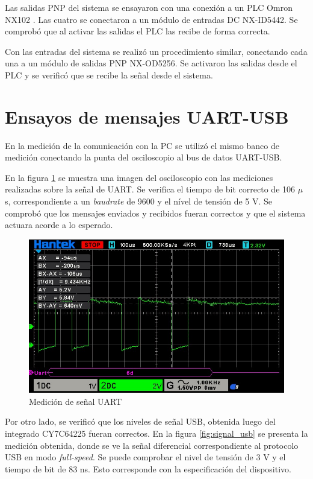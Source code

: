 Las salidas PNP del sistema se ensayaron con una conexión a un PLC Omron NX102 \citep{web_nx102}. Las cuatro se conectaron a un módulo de entradas DC NX-ID5442. Se comprobó que al activar las salidas el PLC las recibe de forma correcta.

Con las entradas del sistema se realizó un procedimiento similar, conectando cada una a un módulo de salidas PNP NX-OD5256. Se activaron las salidas desde el PLC y se verificó que se recibe la señal desde el sistema.

\section{Ensayos de mensajes UART-USB}

En la medición de la comunicación con la PC se utilizó el mismo banco de medición conectando la punta del osciloscopio al bus de datos UART-USB.

En la figura \ref{fig:signal_uart} se muestra una imagen del osciloscopio con las mediciones realizadas sobre la señal de UART. Se verifica el tiempo de bit correcto de 106 $\mu$s, correspondiente a un \textit{baudrate} de 9600 y el nível de tensión de 5 V. Se comprobó que los mensajes enviados y recibidos fueran correctos y que el sistema actuara acorde a lo esperado.

\begin{figure}[h!]
	\centering
	\includegraphics[scale=0.6]{./Figures/bit_time_uart.jpeg}
	\caption{Medición de señal UART}
	\label{fig:signal_uart}
\end{figure}

\newpage

Por otro lado, se verificó que los niveles de señal USB, obtenida luego del integrado CY7C64225 fueran correctos. En la figura \ref{fig:signal_usb} se presenta la medición obtenida, donde se ve la señal diferencial correspondiente al protocolo USB en modo \textit{full-speed}. Se puede comprobar el nivel de tensión de 3 V y el tiempo de bit de 83 ns. Esto corresponde con la especificación del dispositivo.

